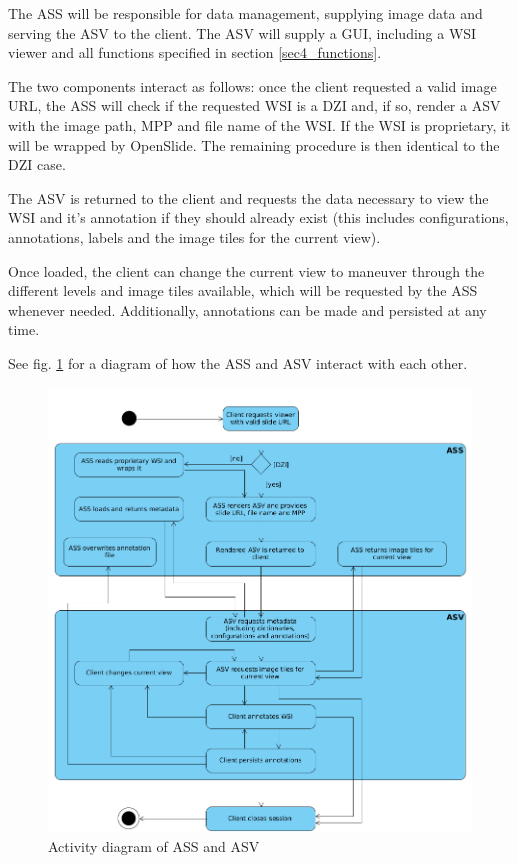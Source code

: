The ASS will be responsible for data management, supplying image data and serving the ASV to the client. The ASV will supply a GUI, including a WSI viewer and all functions specified in section \ref{sec4_functions}.

The two components interact as follows: once the client requested a valid image URL, the ASS will check if the requested WSI is a DZI and, if so, render a ASV with the image path, MPP and file name of the WSI. If the WSI is proprietary, it will be wrapped by OpenSlide. The remaining procedure is then identical to the DZI case.

The ASV is returned to the client and requests the data necessary to view the WSI and it's annotation if they should already exist (this includes configurations, annotations, labels and the image tiles for the current view).

Once loaded, the client can change the current view to maneuver through the different levels and image tiles available, which will be requested by the ASS whenever needed. Additionally, annotations can be made and persisted at any time.

See fig. \ref{fig4_asUml} for a diagram of how the ASS and ASV interact with each other.

\begin{figure}[!h]
	\begin{center}
		\includegraphics[scale=0.4]{img/asUML.png}
		\caption{Activity diagram of ASS and ASV}
		\label{fig4_asUml}
	\end{center}
\end{figure}


